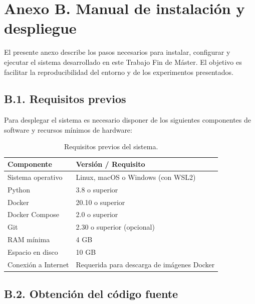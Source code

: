 \documentclass[12pt,a4paper]{article}
\begin{document}
\newpage
\section*{Anexo B. Manual de instalación y despliegue}

El presente anexo describe los pasos necesarios para instalar, configurar y ejecutar el sistema desarrollado en este Trabajo Fin de Máster. El objetivo es facilitar la reproducibilidad del entorno y de los experimentos presentados.

\subsection*{B.1. Requisitos previos}

Para desplegar el sistema es necesario disponer de los siguientes componentes de software y recursos mínimos de hardware:

\begin{table}[h!]
    \centering
    \begin{tabular}{|l|l|}
        \hline
        \textbf{Componente} & \textbf{Versión / Requisito}               \\ \hline
        Sistema operativo   & Linux, macOS o Windows (con WSL2)          \\ \hline
        Python              & 3.8 o superior                             \\ \hline
        Docker              & 20.10 o superior                           \\ \hline
        Docker Compose      & 2.0 o superior                             \\ \hline
        Git                 & 2.30 o superior (opcional)                 \\ \hline
        RAM mínima          & 4 GB                                       \\ \hline
        Espacio en disco    & 10 GB                                      \\ \hline
        Conexión a Internet & Requerida para descarga de imágenes Docker \\ \hline
    \end{tabular}
    \caption{Requisitos previos del sistema.}
\end{table}

\subsection*{B.2. Obtención del código fuente}
\end{document}
